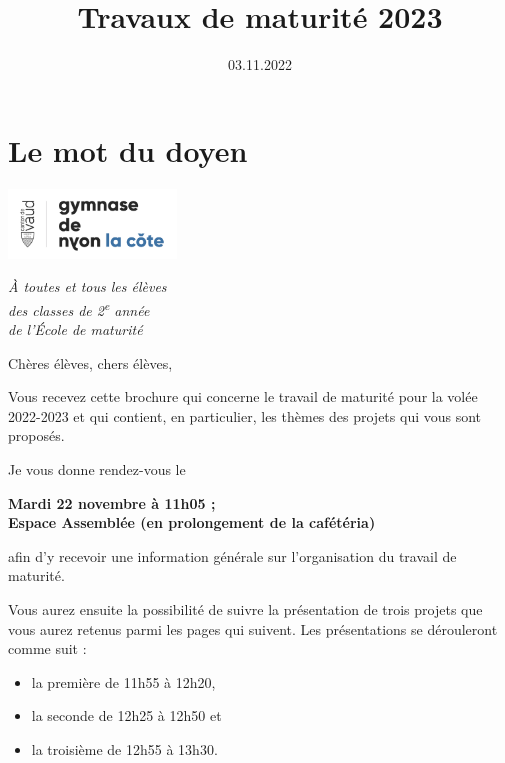 \documentclass[
  10pt,
  french,
  a5paper,
  openany]{book}
\title{Travaux de maturité 2023}
\author{}
\date{\vspace{-2.5em}03.11.2022}
\providecommand{\tightlist}{%
  \setlength{\itemsep}{0pt}\setlength{\parskip}{0pt}}
\newenvironment{signature}{\begin{flushright}}{\end{flushright}}
\begin{document}
\maketitle

{
\setcounter{tocdepth}{0}
\tableofcontents
}
\hypertarget{le-mot-du-doyen}{%
\chapter*{Le mot du doyen}\label{le-mot-du-doyen}}

\includegraphics[width=\textwidth,height=5em]{images/logoGNLC.png}


\begin{signature}
\emph{À toutes et tous les élèves}\\
\emph{des classes de 2\textsuperscript{e} année}\\
\emph{de l'École de maturité}

\end{signature}


Chères élèves, chers élèves,

Vous recevez cette brochure qui concerne le travail de maturité pour la volée 2022-2023 et qui contient, en particulier, les thèmes des projets qui vous sont proposés.

Je vous donne rendez-vous le

\begin{center}
\textbf{Mardi 22 novembre à 11h05 ;\\
Espace Assemblée (en prolongement de la cafétéria)}

\end{center}

afin d'y recevoir une information générale sur l'organisation du travail de maturité.

Vous aurez ensuite la possibilité de suivre la présentation de trois projets que vous aurez retenus parmi les pages qui suivent. Les présentations se dérouleront comme suit :

\begin{itemize}
\tightlist
\item
  la première de 11h55 à 12h20,
\item
  la seconde de 12h25 à 12h50 et
\item
  la troisième de 12h55 à 13h30.
\end{itemize}
\end{document}
